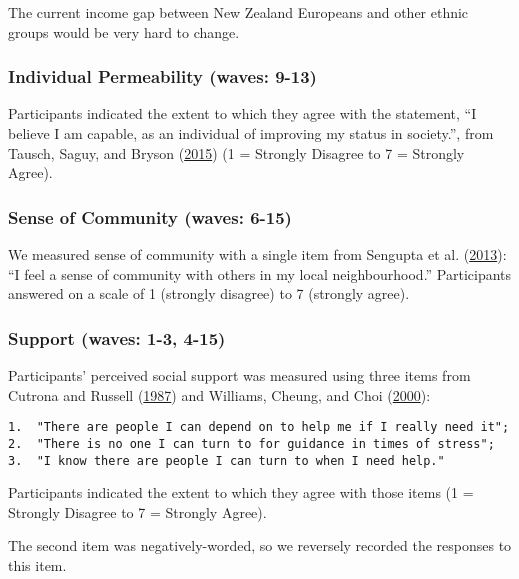 \documentclass[
  singlecolumn]{report}
\begin{document}
The current income gap between New Zealand Europeans and other ethnic
groups would be very hard to change.

\hypertarget{individual-permeability-waves-9-13}{%
\subsubsection{Individual Permeability (waves:
9-13)}\label{individual-permeability-waves-9-13}}

Participants indicated the extent to which they agree with the
statement, ``I believe I am capable, as an individual of improving my
status in society.'', from Tausch, Saguy, and Bryson
(\protect\hyperlink{ref-tausch2015}{2015}) (1 = Strongly Disagree to 7 =
Strongly Agree).

\hypertarget{sense-of-community-waves-6-15}{%
\subsubsection{Sense of Community (waves:
6-15)}\label{sense-of-community-waves-6-15}}

We measured sense of community with a single item from Sengupta et al.
(\protect\hyperlink{ref-sengupta2013}{2013}): ``I feel a sense of
community with others in my local neighbourhood.'' Participants answered
on a scale of 1 (strongly disagree) to 7 (strongly agree).

\hypertarget{support-waves-1-3-4-15}{%
\subsubsection{Support (waves: 1-3,
4-15)}\label{support-waves-1-3-4-15}}

Participants' perceived social support was measured using three items
from Cutrona and Russell (\protect\hyperlink{ref-cutrona1987}{1987}) and
Williams, Cheung, and Choi
(\protect\hyperlink{ref-williams_cyberostracism_2000}{2000}):

\begin{verbatim}
1.  "There are people I can depend on to help me if I really need it";
2.  "There is no one I can turn to for guidance in times of stress";
3.  "I know there are people I can turn to when I need help." 
\end{verbatim}

Participants indicated the extent to which they agree with those items
(1 = Strongly Disagree to 7 = Strongly Agree).

The second item was negatively-worded, so we reversely recorded the
responses to this item.
\end{document}
